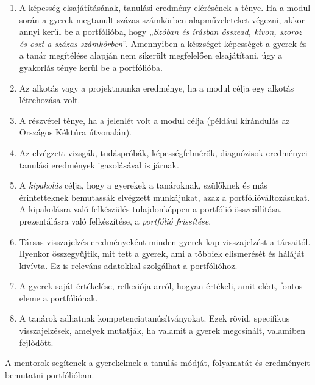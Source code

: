 \begin{enumerate}
\def\labelenumi{\arabic{enumi}.}
\item
  A képesség elsajátításának, tanulási eredmény elérésének a ténye. Ha a
  modul során a gyerek megtanult százas számkörben alapműveleteket
  végezni, akkor annyi kerül be a portfólióba, hogy „\emph{Szóban és
  írásban összead, kivon, szoroz és oszt a százas számkörben}''.
  Amennyiben a készséget-képességet a gyerek és a tanár megítélése
  alapján nem sikerült megfelelően elsajátítani, úgy a gyakorlás ténye
  kerül be a portfólióba.
\item
  Az alkotás vagy a projektmunka eredménye, ha a modul célja egy alkotás
  létrehozása volt.
\item
  A részvétel ténye, ha a jelenlét volt a modul célja (például
  kirándulás az Országos Kéktúra útvonalán).
\item
  Az elvégzett vizsgák, tudáspróbák, képességfelmérők, diagnózisok
  eredményei tanulási eredmények igazolásával is járnak.
\item
  A \emph{kipakolás} célja, hogy a gyerekek a tanároknak, szülőknek és
  más érintetteknek bemutassák elvégzett munkájukat, azaz a
  portfólióváltozásukat. A kipakolásra való felkészülés tulajdonképpen a
  portfólió összeállítása, prezentálásra való felkészítése, a
  \emph{portfólió frissítése}.
\item
  Társas visszajelzés eredményeként minden gyerek kap visszajelzést a
  társaitól. Ilyenkor összegyűjtik, mit tett a gyerek, ami a többiek
  elismerését és háláját kivívta. Ez is releváns adatokkal szolgálhat a
  portfólióhoz.
\item
  A gyerek saját értékelése, reflexiója arról, hogyan értékeli, amit
  elért, fontos eleme a portfóliónak.
\item
  A tanárok adhatnak kompetenciatanúsítványokat. Ezek rövid, specifikus
  visszajelzések, amelyek mutatják, ha valamit a gyerek megcsinált,
  valamiben fejlődött.
\end{enumerate}

A mentorok segítenek a gyerekeknek a tanulás módját, folyamatát és
eredményeit bemutatni portfólióban.

